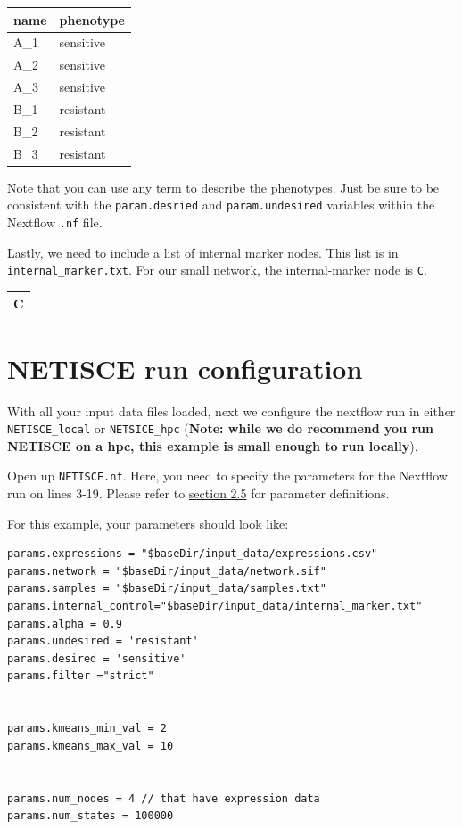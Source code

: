 \documentclass[
]{book}
\begin{document}
\begin{tabular}{l|l}
\hline
name & phenotype\\
\hline
A\_1 & sensitive\\
\hline
A\_2 & sensitive\\
\hline
A\_3 & sensitive\\
\hline
B\_1 & resistant\\
\hline
B\_2 & resistant\\
\hline
B\_3 & resistant\\
\hline
\end{tabular}

Note that you can use any term to describe the phenotypes. Just be sure to be consistent with the \texttt{param.desried} and \texttt{param.undesired} variables within the Nextflow \texttt{.nf} file.

Lastly, we need to include a list of internal marker nodes. This list is in \texttt{internal\_marker.txt}. For our small network, the internal-marker node is \texttt{C}.

\begin{tabular}{l}
\hline
C\\


\hline
\end{tabular}

\hypertarget{netisce-run-configuration}{%
\section{NETISCE run configuration}\label{netisce-run-configuration}}

With all your input data files loaded, next we configure the nextflow run in either \texttt{NETISCE\_local} or \texttt{NETSICE\_hpc} (\textbf{Note: while we do recommend you run NETISCE on a hpc, this example is small enough to run locally}).

Open up \texttt{NETISCE.nf}. Here, you need to specify the parameters for the Nextflow run on lines 3-19. Please refer to \protect\hyperlink{params}{section 2.5} for parameter definitions.

For this example, your parameters should look like:

\begin{verbatim}
params.expressions = "$baseDir/input_data/expressions.csv"
params.network = "$baseDir/input_data/network.sif"
params.samples = "$baseDir/input_data/samples.txt"
params.internal_control="$baseDir/input_data/internal_marker.txt"
params.alpha = 0.9
params.undesired = 'resistant'
params.desired = 'sensitive'
params.filter ="strict"


params.kmeans_min_val = 2
params.kmeans_max_val = 10


params.num_nodes = 4 // that have expression data
params.num_states = 100000
\end{verbatim}
\end{document}
